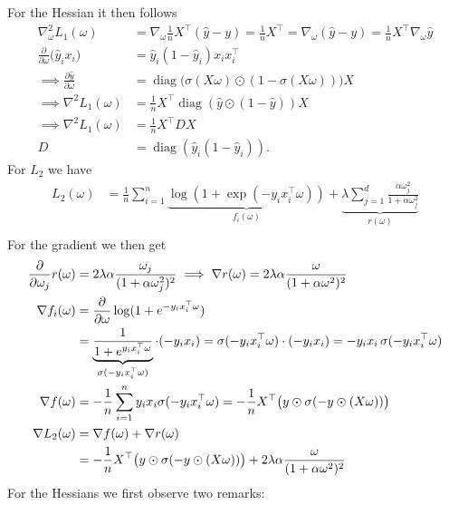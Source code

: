 \documentclass{article}
\begin{document}
For the Hessian it then follows
\begin{align*}
\nabla^2 _\omega L_1(\omega) &= \nabla_\omega \frac{1}{n} X^\top (\hat{y} - y) 
= \frac{1}{n} X^\top  
= \nabla _\omega (\hat{y}-y)
= \frac{1}{n} X^\top  \nabla _\omega \hat{y} \\
%
\frac{\partial}{\partial \omega} \big( \hat{y}_i x_i \big) 
&= \hat{y}_i (1 - \hat{y}_i) x_i x_i^\top\\
%
\implies \frac{\partial \hat{y}}{\partial \omega} &= \operatorname{diag}\bigl(\sigma(X\omega) \odot (1 - \sigma(X\omega))\bigr) X \\
%
\implies \nabla^2 L_1(\omega) &= \frac{1}{n} X^\top \operatorname{diag}(\hat{y} \odot (1 - \hat{y})) X \\
%
\implies \nabla^2 L_1(\omega) &= \frac{1}{n} X^\top D X\\
D &= \operatorname{diag}(\hat{y}_i (1 - \hat{y}_i)).
\end{align*}
For $L_2$ we have
\begin{align*}
L_2(\omega) &= \frac{1}{n} \sum_{i=1}^n \underbrace{\log \left(1 + \exp(-y_i x_i^\top \omega)\right) }_{f_i(\omega)} + \underbrace{\lambda \sum_{j=1}^d \frac{\alpha \omega_j^2}{1 + \alpha \omega_j^2}}_{r(\omega)} \\
\end{align*}
For the gradient we then get
\begin{align*}
\frac{\partial}{\partial \omega_j} r(\omega) &= 2 \lambda \alpha \frac{\omega_j}{(1 + \alpha \omega_j^2)^2}
 \implies \nabla r(\omega) = 2 \lambda \alpha \frac{\omega}{(1 + \alpha \omega^2)^2} \\
%
\nabla f_i(\omega) &= \frac{\partial}{\partial \omega} \log(1 + e^{-y_i x_i^\top \omega}) \notag \\
&= \underbrace{\frac{1}{1 + e^{y_i x_i^\top \omega}}}_{\sigma(-y_i x_i^\top \omega)} \cdot (-y_i x_i) = \sigma(-y_i x_i^\top \omega) \cdot (-y_i x_i) = -y_i x_i \, \sigma(-y_i x_i^\top \omega) \notag\\
%
\nabla f(\omega) &= -\frac{1}{n} \sum_{i=1}^n y_i x_i \sigma(-y_i x_i^\top \omega) = -\frac{1}{n} X^\top \big(y \odot \sigma(-y \odot (X \omega))\big) \\
\nabla L_2(\omega) &= \nabla f(\omega) + \nabla r(\omega) \notag \\
 &= -\frac{1}{n} X^\top \big(y \odot \sigma(-y \odot (X \omega))\big) + 2 \lambda \alpha \frac{\omega}{(1 + \alpha \omega^2)^2}
\end{align*}
For the Hessians we first observe two remarks:\\
\end{document}
